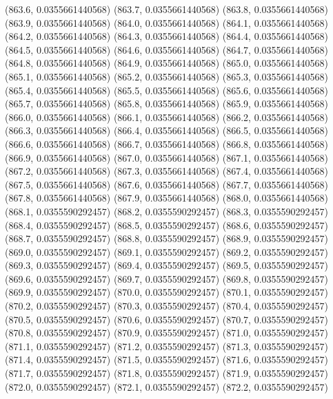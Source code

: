 {					(863.6, 0.0355661440568)
					(863.7, 0.0355661440568)
					(863.8, 0.0355661440568)
					(863.9, 0.0355661440568)
					(864.0, 0.0355661440568)
					(864.1, 0.0355661440568)
					(864.2, 0.0355661440568)
					(864.3, 0.0355661440568)
					(864.4, 0.0355661440568)
					(864.5, 0.0355661440568)
					(864.6, 0.0355661440568)
					(864.7, 0.0355661440568)
					(864.8, 0.0355661440568)
					(864.9, 0.0355661440568)
					(865.0, 0.0355661440568)
					(865.1, 0.0355661440568)
					(865.2, 0.0355661440568)
					(865.3, 0.0355661440568)
					(865.4, 0.0355661440568)
					(865.5, 0.0355661440568)
					(865.6, 0.0355661440568)
					(865.7, 0.0355661440568)
					(865.8, 0.0355661440568)
					(865.9, 0.0355661440568)
					(866.0, 0.0355661440568)
					(866.1, 0.0355661440568)
					(866.2, 0.0355661440568)
					(866.3, 0.0355661440568)
					(866.4, 0.0355661440568)
					(866.5, 0.0355661440568)
					(866.6, 0.0355661440568)
					(866.7, 0.0355661440568)
					(866.8, 0.0355661440568)
					(866.9, 0.0355661440568)
					(867.0, 0.0355661440568)
					(867.1, 0.0355661440568)
					(867.2, 0.0355661440568)
					(867.3, 0.0355661440568)
					(867.4, 0.0355661440568)
					(867.5, 0.0355661440568)
					(867.6, 0.0355661440568)
					(867.7, 0.0355661440568)
					(867.8, 0.0355661440568)
					(867.9, 0.0355661440568)
					(868.0, 0.0355661440568)
					(868.1, 0.0355590292457)
					(868.2, 0.0355590292457)
					(868.3, 0.0355590292457)
					(868.4, 0.0355590292457)
					(868.5, 0.0355590292457)
					(868.6, 0.0355590292457)
					(868.7, 0.0355590292457)
					(868.8, 0.0355590292457)
					(868.9, 0.0355590292457)
					(869.0, 0.0355590292457)
					(869.1, 0.0355590292457)
					(869.2, 0.0355590292457)
					(869.3, 0.0355590292457)
					(869.4, 0.0355590292457)
					(869.5, 0.0355590292457)
					(869.6, 0.0355590292457)
					(869.7, 0.0355590292457)
					(869.8, 0.0355590292457)
					(869.9, 0.0355590292457)
					(870.0, 0.0355590292457)
					(870.1, 0.0355590292457)
					(870.2, 0.0355590292457)
					(870.3, 0.0355590292457)
					(870.4, 0.0355590292457)
					(870.5, 0.0355590292457)
					(870.6, 0.0355590292457)
					(870.7, 0.0355590292457)
					(870.8, 0.0355590292457)
					(870.9, 0.0355590292457)
					(871.0, 0.0355590292457)
					(871.1, 0.0355590292457)
					(871.2, 0.0355590292457)
					(871.3, 0.0355590292457)
					(871.4, 0.0355590292457)
					(871.5, 0.0355590292457)
					(871.6, 0.0355590292457)
					(871.7, 0.0355590292457)
					(871.8, 0.0355590292457)
					(871.9, 0.0355590292457)
					(872.0, 0.0355590292457)
					(872.1, 0.0355590292457)
					(872.2, 0.0355590292457)
}
